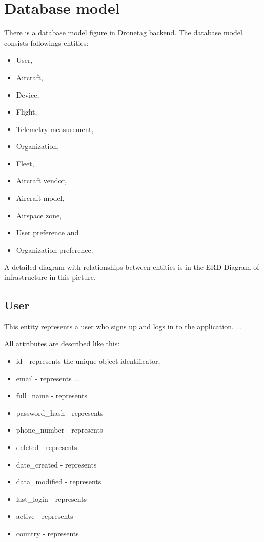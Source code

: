 \section{Database model}\label{sec:database-model}
There is a database model figure in Dronetag backend.
The database model consists followings entities:
\begin{itemize}
    \item User,
    \item Aircraft,
    \item Device,
    \item Flight,
    \item Telemetry measurement,
    \item Organization,
    \item Fleet,
    \item Aircraft vendor,
    \item Aircraft model,
    \item Airspace zone,
    \item User preference and
    \item Organization preference.
\end{itemize}
A detailed diagram with relationships between entities is in the ERD Diagram of infrastructure in this picture.%

\subsection{User}\label{subsec:user}
This entity represents a user who signs up and logs in to the application.
...

All attributes are described like this:
\begin{itemize}
    \item id - represents the unique object identificator,
    \item email - represents ...
    \item full\_name - represents
    \item password\_hash - represents
    \item phone\_number - represents
    \item deleted - represents
    \item date\_created - represents
    \item data\_modified - represents
    \item last\_login - represents
    \item active - represents
    \item country - represents
\end{itemize}

